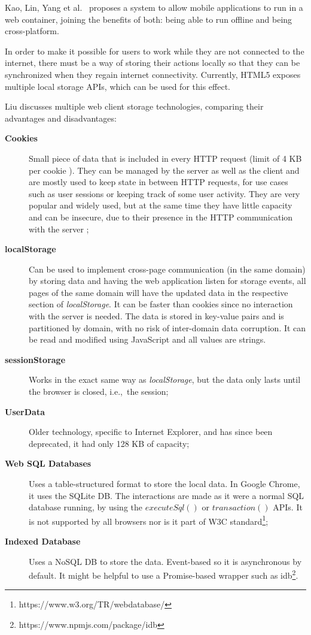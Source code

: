 Kao, Lin, Yang et al.\ \cite{Kao2012} proposes a system to allow mobile applications to run in a web container, joining the benefits of both: being able to run offline and being cross-platform.

In order to make it possible for users to work while they are not connected to the internet, there must be a way of storing their actions locally so that they can be synchronized when they regain internet connectivity. Currently, HTML5 exposes multiple local storage APIs, which can be used for this effect.

Liu \cite{Liu2014} discusses multiple web client storage technologies, comparing their advantages and disadvantages:
\begin{description}
    \item[\textbf{Cookies}] Small piece of data that is included in every HTTP request (limit of 4 KB per cookie \cite{cookies-rfc}). They can be managed by the server as well as the client and are mostly used to keep state in between HTTP requests, for use cases such as user sessions or keeping track of some user activity. They are very popular and widely used, but at the same time they have little capacity and can be insecure, due to their presence in the HTTP communication with the server \cite{Velagapudi2019} \cite{Kwon2020};
    \item[\textbf{localStorage}] Can be used to implement cross-page communication (in the same domain) by storing data and having the web application listen for storage events, all pages of the same domain will have the updated data in the respective section of \textit{localStorage}. It can be faster than cookies since no interaction with the server is needed.
    The data is stored in key-value pairs and is partitioned by domain, with no risk of inter-domain data corruption. It can be read and modified using JavaScript and all values are strings.
    \item[\textbf{sessionStorage}] Works in the exact same way as \textit{localStorage}, but the data only lasts until the browser is closed, i.e.,\ the session;
    \item[\textbf{UserData}] Older technology, specific to Internet Explorer, and has since been deprecated, it had only 128 KB of capacity;
    \item[\textbf{Web SQL Databases}] Uses a table-structured format to store the local data. In Google Chrome, it uses the SQLite DB. The interactions are made as it were a normal SQL database running, by using the $executeSql()$ or $transaction()$ APIs. It is not supported by all browsers nor is it part of W3C standard\footnote{https://www.w3.org/TR/webdatabase/};
    \item[\textbf{Indexed Database}] Uses a NoSQL DB to store the data. Event-based so it is asynchronous by default. It might be helpful to use a Promise-based wrapper \cite{promises-js-mdn} such as idb\footnote{https://www.npmjs.com/package/idb}.
\end{description}

